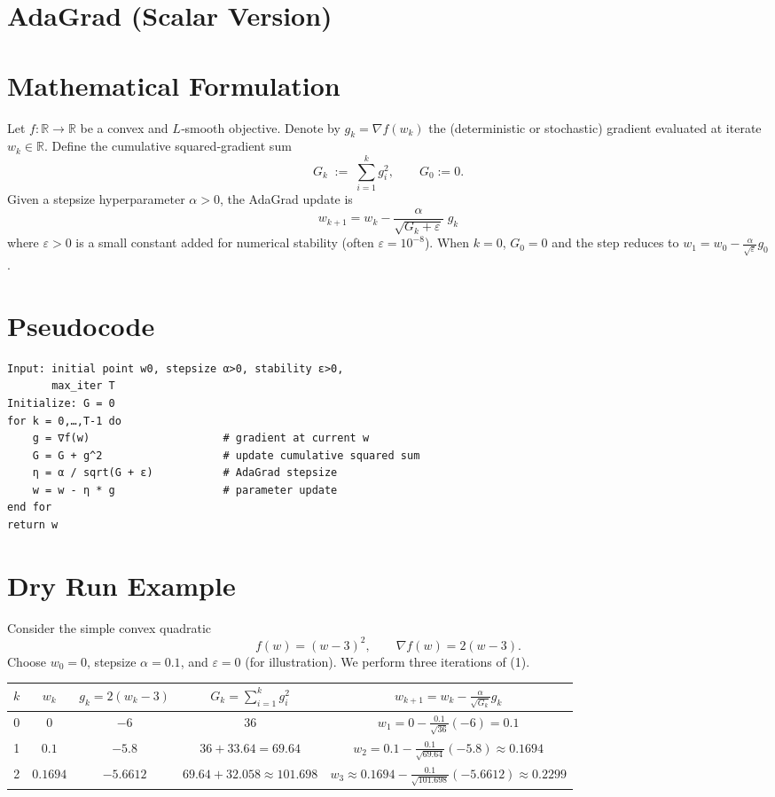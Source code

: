 \documentclass{article}
\begin{document}
\section*{AdaGrad (Scalar Version)}

\section*{Mathematical Formulation}
Let $f:\mathbb{R}\rightarrow\mathbb{R}$ be a convex and $L$‑smooth objective.  
Denote by $g_k=\nabla f(w_k)$ the (deterministic or stochastic) gradient evaluated at iterate $w_k\in\mathbb{R}$.  
Define the cumulative squared‑gradient sum
\[
G_k \;:=\;\sum_{i=1}^{k} g_i^{2},\qquad G_0:=0 .
\]
Given a stepsize hyperparameter $\alpha>0$, the AdaGrad update is
\[
\boxed{ \; w_{k+1}= w_{k}-\frac{\alpha}{\sqrt{G_k+\varepsilon}}\;g_k\; } \tag{1}
\]
where $\varepsilon>0$ is a small constant added for numerical stability (often $\varepsilon=10^{-8}$).  
When $k=0$, $G_0=0$ and the step reduces to $w_{1}=w_{0}-\frac{\alpha}{\sqrt{\varepsilon}}g_{0}$.

\section*{Pseudocode}
\begin{verbatim}
Input: initial point w0, stepsize α>0, stability ε>0,
       max_iter T
Initialize: G = 0
for k = 0,…,T-1 do
    g = ∇f(w)                     # gradient at current w
    G = G + g^2                   # update cumulative squared sum
    η = α / sqrt(G + ε)           # AdaGrad stepsize
    w = w - η * g                 # parameter update
end for
return w
\end{verbatim}

\section*{Dry Run Example}
Consider the simple convex quadratic
\[
f(w)=(w-3)^2 ,\qquad \nabla f(w)=2(w-3).
\]
Choose $w_0=0$, stepsize $\alpha=0.1$, and $\varepsilon=0$ (for illustration).  
We perform three iterations of (1).

\begin{center}
\begin{tabular}{c|c|c|c|c}
$k$ & $w_k$ & $g_k=2(w_k-3)$ & $G_k=\sum_{i=1}^{k}g_i^{2}$ & $w_{k+1}=w_k-\frac{\alpha}{\sqrt{G_k}}g_k$\\
\hline
0 & $0$ & $-6$ & $36$ & $w_1=0-\frac{0.1}{\sqrt{36}}(-6)=0.1$\\[4pt]
1 & $0.1$ & $-5.8$ & $36+33.64=69.64$ & $w_2=0.1-\frac{0.1}{\sqrt{69.64}}(-5.8)\approx0.1694$\\[4pt]
2 & $0.1694$ & $-5.6612$ & $69.64+32.058\approx101.698$ &
$w_3\approx0.1694-\frac{0.1}{\sqrt{101.698}}(-5.6612)\approx0.2299$
\end{tabular}
\end{center}
\end{document}
